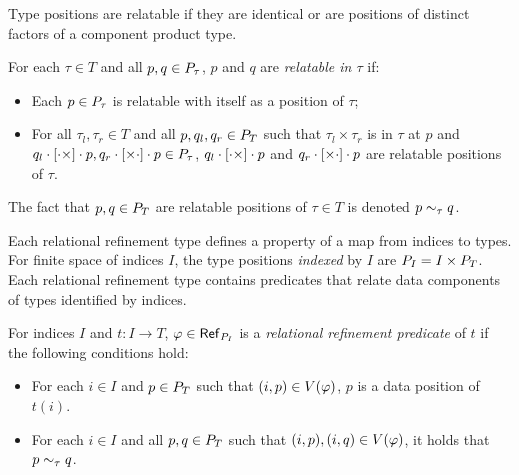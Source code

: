 Type positions are relatable if they are identical or are positions of
distinct factors of a component product type.
%
\begin{defn}
  \label{defn:relatable}
  For each $\tau \in T$ and all $p, q \in P_{\tau}$, $p$ and $q$
  are \emph{relatable in $\tau$} if:
  \begin{itemize}
  \item %
    Each $p \in P_{\tau}$ is relatable with itself as a position
    of $\tau$;
  \item %
    For all $\tau_l, \tau_r \in T$ and all $p, q_l, q_r \in P_T$
    such that $\tau_l \times \tau_r$ is in $\tau$ at $p$ and
    $q_l \cdot [ \cdot \times ] \cdot p, q_r \cdot [ \times \cdot
    ] \cdot p \in P_{\tau}$,
    $q_l \cdot [ \cdot \times ] \cdot p$ and
    $q_r \cdot [ \times \cdot ] \cdot p$ are relatable positions
    of $\tau$.
  \end{itemize}
\end{defn}
%
The fact that $p, q \in P_T$ are relatable positions of
$\tau \in T$ is denoted $p \sim_{\tau} q$.

Each relational refinement type defines a property of a map from
indices to types.
%
For finite space of indices $I$, the type positions \emph{indexed} by
$I$ are $P_{I} = I \times P_T$.
Each relational refinement type contains predicates that relate data
components of types identified by indices.
%
\begin{defn}
  \label{defn:ref-refinements}
  For indices $I$ and $t : I \to T$,
  $\varphi \in \mathsf{Ref}_{ P_{I} }$ is a \emph{relational
    refinement predicate} of $t$ if the following conditions hold:
  \begin{itemize}
  \item %
    For each $i \in I$ and $p \in P_T$ such that
    $(i, p) \in V(\varphi)$, $p$ is a data position of $t(i)$.
  \item %
    For each $i \in I$ and all $p, q \in P_T$ such that
    $(i, p), (i, q) \in V(\varphi)$, it holds that
    $p \sim_{\tau} q$.
  \end{itemize}
\end{defn}

